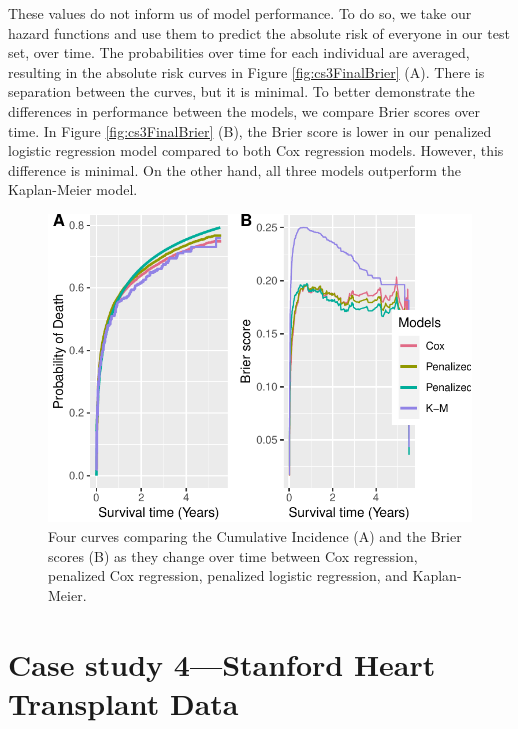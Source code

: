 \documentclass[
]{jss}
\begin{document}
These values do not inform us of model performance. To do so, we take
our hazard functions and use them to predict the absolute risk of
everyone in our test set, over time. The probabilities over time for
each individual are averaged, resulting in the absolute risk curves in
Figure \ref{fig:cs3FinalBrier} (A). There is separation between the
curves, but it is minimal. To better demonstrate the differences in
performance between the models, we compare Brier scores over time. In
Figure \ref{fig:cs3FinalBrier} (B), the Brier score is lower in our
penalized logistic regression model compared to both Cox regression
models. However, this difference is minimal. On the other hand, all
three models outperform the Kaplan-Meier model.

\begin{CodeChunk}
\begin{figure}

{\centering \includegraphics{../figures/riskregressionBrier-1} 

}

\caption{\label{fig:cs3FinalBrier} Four curves comparing the Cumulative Incidence (A) and the Brier scores (B) as they change over time between Cox regression, penalized Cox regression, penalized logistic regression, and Kaplan-Meier.}\label{fig:riskregressionBrier}
\end{figure}
\end{CodeChunk}

\hypertarget{case-study-4stanford-heart-transplant-data}{%
\section{Case study 4---Stanford Heart Transplant
Data}\label{case-study-4stanford-heart-transplant-data}}
\end{document}
